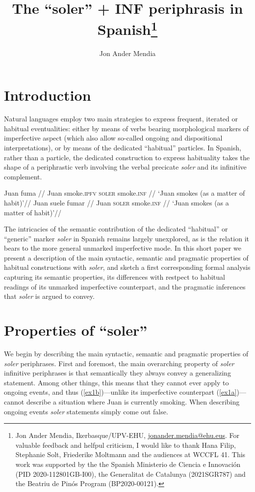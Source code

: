 \documentclass{cascadilla-xelatex-biblatex}
\title{The ``soler'' + INF periphrasis in Spanish\thanks{Jon Ander Mendia, Ikerbasque/UPV-EHU, \url{jonander.mendia@ehu.eus}. For valuable feedback and helfpul criticism, I would like to thank Hana Filip, Stephanie Solt, Friederike Moltmann and the audiences at WCCFL 41. This work was supported by the the Spanish Ministerio de Ciencia e Innovaci{\'o}n (PID 2020-112801GB-I00), the Generalitat de Catalunya (2021SGR787) and the Beatriu de Pin{\'o}s Program (BP2020-00121).}}
\author{Jon Ander Mendia}
\begin{document}
	
	\maketitle
	
	\section{Introduction}
	
	Natural languages employ two main strategies to express frequent, iterated or habitual eventualities: either by means of verbs bearing morphological markers of imperfective aspect (which also allow so-called ongoing and dispositional interpretations), or by means of the dedicated ``habitual'' particles. In Spanish, rather than a particle, the dedicated construction to express habituality takes the shape of a periphrastic verb involving the verbal precicate \textit{soler} and its infinitive complement.
	
	\pex
	\a\label{ex1a}\begingl
	\gla Juan fuma //
	\glb Juan smoke.\textsc{ipfv} {} {} \textsc{soler} smoke.\textsc{inf} {} //
	\glft `Juan smokes (as a matter of habit)'//
	\endgl
	\a\label{ex1b}\begingl
	\gla Juan suele fumar //
	\glb Juan \textsc{soler} smoke.\textsc{inf} {} //
	\glft `Juan smokes (as a matter of habit)'//
	\endgl
	\xe
	
	
	The intricacies of the semantic contribution of the dedicated ``habitual'' or ``generic'' marker \textit{soler} in Spanish remains largely unexplored, as is the relation it bears to the more general unmarked imperfective mode. In this short paper we present a description of the main syntactic, semantic and pragmatic properties of habitual constructions with \textit{soler}, and sketch a first corresponding formal analysis capturing its semantic properties, its differences with restpect to habitual readings of its unmarked imperfective counterpart, and the pragmatic inferences that \textit{soler} is argued to convey. %
	
	
	\section{Properties of ``soler''}
	
	We begin by describing the main syntactic, semantic and pragmatic properties of \textit{soler} periphrases. First and foremost, the main overarching property of \textit{soler} infinitive periphrases is that semantically they always convey a generalizing statement. Among other things, this means that they cannot ever apply to ongoing events, and thus (\ref{ex1b})---unlike its imperfective counterpart (\ref{ex1a})---cannot describe a situation where Juan is currently smoking. When describing ongoing events \textit{soler} statements simply come out false.
	
\end{document}
